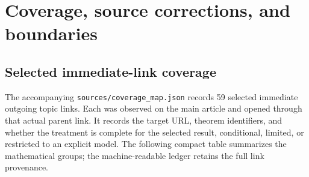 \section{Coverage, source corrections, and boundaries}
\label{sec:coverage}

\subsection{Selected immediate-link coverage}
The accompanying \texttt{sources/coverage\_map.json} records 59 selected immediate outgoing topic links. Each was observed on the main article and opened through that actual parent link. It records the target URL, theorem identifiers, and whether the treatment is complete for the selected result, conditional, limited, or restricted to an explicit model. The following compact table summarizes the mathematical groups; the machine-readable ledger retains the full link provenance.

